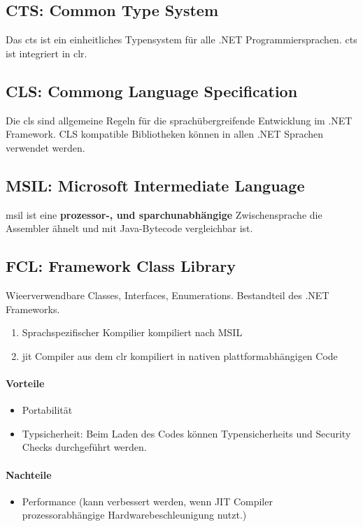 \documentclass[
a4paper,
oneside,
10pt,
fleqn,
headsepline,
toc=listofnumbered, 
bibliography=totocnumbered]{scrartcl}
\begin{document}
\subsection{CTS: Common Type System}
Das \gls{cts} ist ein einheitliches Typensystem für alle .NET Programmiersprachen. \gls{cts} ist integriert in \gls{clr}. 

\subsection{CLS: Commong Language Specification}
Die \gls{cls} sind allgemeine Regeln für die sprachübergreifende Entwicklung im .NET Framework. CLS kompatible Bibliotheken können in allen .NET Sprachen verwendet werden.

\subsection{MSIL: Microsoft Intermediate Language}
\gls{msil} ist eine \textbf{prozessor-, und sparchunabhängige} Zwischensprache die Assembler ähnelt und mit Java-Bytecode vergleichbar ist.

\subsection{FCL: Framework Class Library}
Wieerverwendbare Classes, Interfaces, Enumerations. Bestandteil des .NET Frameworks.

\begin{enumerate}
	\item Sprachspezifischer Kompilier kompiliert nach MSIL
	\item \gls{jit} Compiler aus dem \gls{clr} kompiliert in nativen plattformabhängigen Code
\end{enumerate}
\paragraph{Vorteile}
\begin{itemize}
	\item Portabilität
	\item Typsicherheit: Beim Laden des Codes können Typensicherheits und Security Checks durchgeführt werden.
\end{itemize}
\paragraph{Nachteile}
\begin{itemize}
	\item Performance (kann verbessert werden, wenn JIT Compiler prozessorabhängige Hardwarebeschleunigung nutzt.)
\end{itemize}
\end{document}
